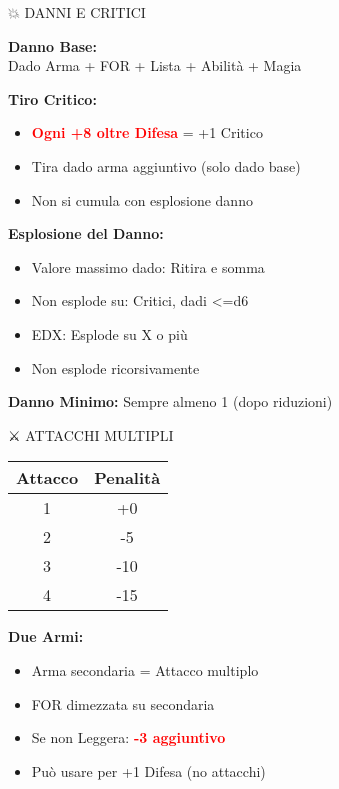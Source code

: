 \documentclass[10pt,a4paper,landscape]{article}
\newcommand{\critical}[1]{\textcolor{red}{\textbf{#1}}}
\begin{document}
\begin{multicols}{4}
		\begin{mainsection}{💥 DANNI E CRITICI}
			\begin{formula}
				\textbf{Danno Base:}\\
				Dado Arma + FOR + Lista + Abilità + Magia
			\end{formula}

			\textbf{Tiro Critico:}
			\begin{itemize}[noitemsep,leftmargin=8pt]
				\item \critical{Ogni +8 oltre Difesa} = +1 Critico
				\item Tira dado arma aggiuntivo (solo dado base)
				\item Non si cumula con esplosione danno
			\end{itemize}

			\textbf{Esplosione del Danno:}
			\begin{itemize}[noitemsep,leftmargin=8pt]
				\item Valore massimo dado: Ritira e somma
				\item Non esplode su: Critici, dadi <=d6
				\item EDX: Esplode su X o più
				\item Non esplode ricorsivamente
			\end{itemize}

			\textbf{Danno Minimo:} Sempre almeno 1 (dopo riduzioni)
		\end{mainsection}

		\begin{mainsection}{⚔️ ATTACCHI MULTIPLI}
			\begin{tabular}{@{}cc@{}}
				\toprule
				\textbf{Attacco} & \textbf{Penalità} \\
				\midrule
				1 & +0 \\
				2 & -5 \\
				3 & -10 \\
				4 & -15 \\
				\bottomrule
			\end{tabular}

			\textbf{Due Armi:}
			\begin{itemize}[noitemsep,leftmargin=8pt]
				\item Arma secondaria = Attacco multiplo
				\item FOR dimezzata su secondaria
				\item Se non Leggera: \critical{-3 aggiuntivo}
				\item Può usare per +1 Difesa (no attacchi)
			\end{itemize}


\end{mainsection}
\end{multicols}
\end{document}
